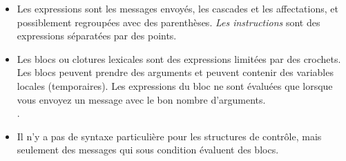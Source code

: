 \documentclass[a4paper,10pt,twoside]{book}
\begin{document}
\begin{itemize}
\item	Les expressions sont les messages envoy\'{e}s, les cascades et les affectations, et possiblement  regroup\'{e}es avec des parenth\`{e}ses.
		\emph{Les instructions} sont des expressions s\'{e}parat\'{e}es par des points.

\item	Les blocs ou clotures lexicales sont des expressions limit\'{e}es par des crochets.
		Les blocs peuvent prendre des arguments et peuvent contenir des variables locales (temporaires).
		Les expressions du bloc ne sont \'{e}valu\'{e}es que lorsque vous envoyez un message  avec le bon nombre d'arguments.\\
		.

\item	Il n'y a pas de syntaxe particuli\`{e}re pour les structures de contr\^{o}le, mais seulement des messages qui sous condition \'{e}valuent des blocs.\\

\end{itemize}

\ifx\wholebook\relax\else
\end{document}
